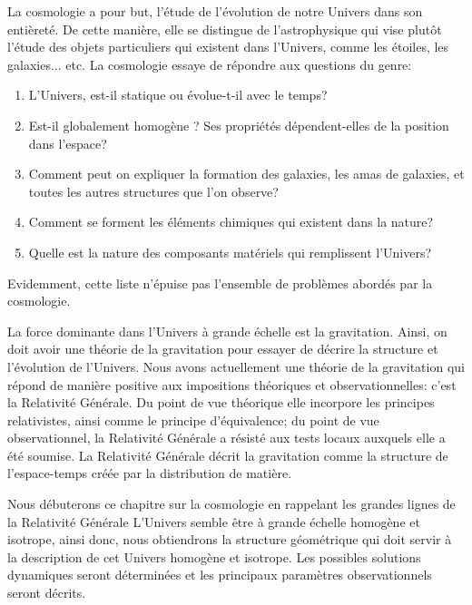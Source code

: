 \documentclass[a4paper,12pt]{report}
\theoremstyle{plain}
\theoremstyle{plain}
\begin{document}
 La cosmologie a pour but,  l'\'etude de l'\'evolution de notre Univers dans son enti\`eret\'e.  De cette mani\`ere,  elle
 se distingue de l'astrophysique qui vise plut\^ot l'\'etude des objets particuliers qui
 existent dans l'Univers,  comme les \'etoiles,  les galaxies...  etc.   La cosmologie essaye de
 r\'epondre aux questions du genre: 
 \begin{enumerate}
 	\item L'Univers,  est-il statique ou \'evolue-t-il avec le temps? \item
 	Est-il globalement homog\`ene ? 
 	Ses propri\'et\'es d\'ependent-elles de la
 	position dans l'espace? \item Comment peut on expliquer la
 	formation des galaxies,  les amas de galaxies,  et toutes les autres
 	structures que l'on observe? \item Comment se forment les
 	\'el\'ements chimiques qui existent dans la nature? \item Quelle est
 	la nature des composants mat\'eriels qui remplissent l'Univers?
 \end{enumerate}
 Evidemment,  cette liste n'\'epuise pas l'ensemble de probl\`emes
 abord\'es par la cosmologie. 
 \par
 La force dominante dans l'Univers \`a grande \'echelle est la
 gravitation.  Ainsi,  on doit avoir une th\'eorie de la gravitation
 pour essayer de d\'ecrire la structure et l'\'evolution de
 l'Univers.  Nous avons actuellement une th\'eorie de la gravitation
 qui r\'epond de mani\`ere positive aux impositions th\'eoriques et
 observationnelles:  c'est la Relativit\'e G\'en\'erale.  Du point de
 vue th\'eorique elle incorpore les principes relativistes,  ainsi
 comme le principe d'\'equivalence; du point de vue
 observationnel,  la Relativit\'e G\'en\'erale a r\'esist\'e aux
 tests locaux auxquels elle a \'et\'e soumise.  La Relativit\'e
 G\'en\'erale d\'ecrit la gravitation comme la structure de
 l'espace-temps cr\'e\'ee par la distribution de mati\`ere. 
 \par
 Nous d\'ebuterons ce chapitre sur la cosmologie en rappelant les
 grandes lignes de la Relativit\'e G\'en\'erale 
 L'Univers semble \^etre \`a grande \'echelle homog\`ene et
 isotrope,  ainsi donc,   nous obtiendrons la structure
 g\'eom\'etrique qui doit servir \`a la description de cet Univers
 homog\`ene et isotrope.  Les possibles solutions dynamiques seront
 d\'etermin\'ees et les principaux param\`etres observationnels seront
 d\'ecrits.
 
\end{document}
